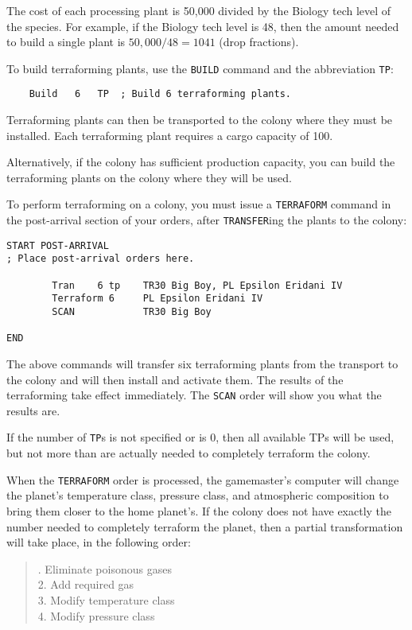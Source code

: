 \documentclass[10pt,titlepage]{article}
\begin{document}
The cost of each processing plant is 50,000 divided by the Biology tech level
of the species.  For example, if the Biology tech level is 48, then the amount
needed to build a single plant is $50,000/48 = 1041$ (drop fractions).

To build terraforming plants, use the \texttt{BUILD} command and the abbreviation \texttt{TP}:

\begin{verbatim}
	Build	6	TP	; Build 6 terraforming plants.\end{verbatim} 

Terraforming plants can then be transported to the colony where they must be
installed.  Each terraforming plant requires a cargo capacity of 100.

Alternatively, if the colony has sufficient production capacity, you can build
the terraforming plants on the colony where they will be used.

To perform terraforming on a colony, you must issue a \texttt{TERRAFORM} command in
the post-arrival section of your orders, after \texttt{TRANSFER}ing the plants to the
colony:

\begin{verbatim}
START POST-ARRIVAL
; Place post-arrival orders here.

        Tran    6 tp    TR30 Big Boy, PL Epsilon Eridani IV
        Terraform 6     PL Epsilon Eridani IV
        SCAN            TR30 Big Boy

END\end{verbatim} 


The above commands will transfer six terraforming plants from the transport
to the colony and will then install and activate them.  The results of the
terraforming take effect immediately.  The \texttt{SCAN} order will show you what the
results are.

If the number of \texttt{TP}s is not specified or is 0, then all available TPs will be
used, but not more than are actually needed to completely terraform the colony.

When the \texttt{TERRAFORM} order is processed, the gamemaster's computer will change
the planet's temperature class, pressure class, and atmospheric composition to
bring them closer to the home planet's.  If the colony does not have exactly
the number needed to completely terraform the planet, then a partial
transformation will take place, in the following order:

\begin{quotation}
	. Eliminate poisonous gases \\
	2. Add required gas \\
	3. Modify temperature class \\
	4. Modify pressure class
\end{quotation} 
\end{document}
